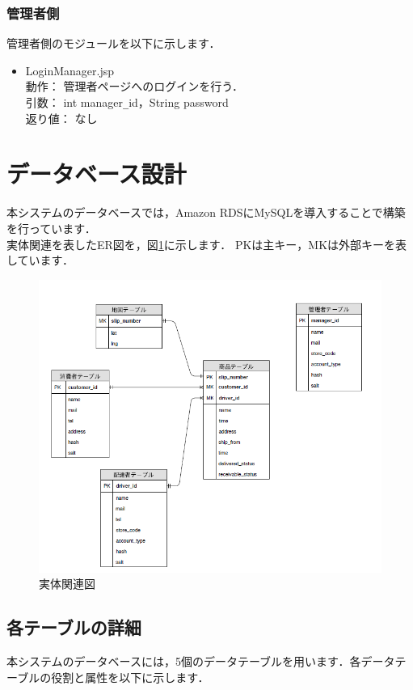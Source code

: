 \documentclass[a4j,titlepage]{jarticle}
\begin{document}
\subsubsection{管理者側}
管理者側のモジュールを以下に示します．
\begin{itemize}
\item LoginManager.jsp\\
  動作： 管理者ページへのログインを行う．\\
  引数： int manager\verb|_|id，String password\\
  返り値： なし
\end{itemize}


\section{データベース設計}
本システムのデータベースでは，Amazon RDSにMySQLを導入することで構築を行っています．\\
実体関連を表したER図を，図\ref{fig:erd}に示します．
PKは主キー，MKは外部キーを表しています．
\begin{figure}[H]
 \begin{center}
  \includegraphics[width=150mm]{erd.png}
  \caption{実体関連図}
  \label{fig:erd}
 \end{center}
\end{figure}
 
\subsection{各テーブルの詳細}
本システムのデータベースには，5個のデータテーブルを用います．各データテーブルの役割と属性を以下に示します．
\end{document}
